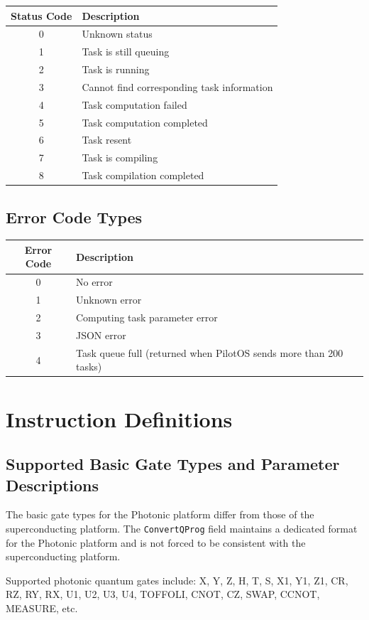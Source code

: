\documentclass[12pt, a4paper]{article}
\begin{document}
\begin{longtable}{|c|p{12cm}|}
\hline
\textbf{Status Code} & \textbf{Description} \\ \hline
\endhead
0 & Unknown status \\ \hline
1 & Task is still queuing \\ \hline
2 & Task is running \\ \hline
3 & Cannot find corresponding task information \\ \hline
4 & Task computation failed \\ \hline
5 & Task computation completed \\ \hline
6 & Task resent \\ \hline
7 & Task is compiling \\ \hline
8 & Task compilation completed \\ \hline
\end{longtable}

\subsection{Error Code Types}

\begin{longtable}{|c|p{12cm}|}
\hline
\textbf{Error Code} & \textbf{Description} \\ \hline
\endhead
0 & No error \\ \hline
1 & Unknown error \\ \hline
2 & Computing task parameter error \\ \hline
3 & JSON error \\ \hline
4 & Task queue full (returned when PilotOS sends more than 200 tasks) \\ \hline
\end{longtable}

\section{Instruction Definitions}

\subsection{Supported Basic Gate Types and Parameter Descriptions}

The basic gate types for the Photonic platform differ from those of the superconducting platform. The \texttt{ConvertQProg} field maintains a dedicated format for the Photonic platform and is not forced to be consistent with the superconducting platform.

Supported photonic quantum gates include: X, Y, Z, H, T, S, X1, Y1, Z1, CR, RZ, RY, RX, U1, U2, U3, U4, TOFFOLI, CNOT, CZ, SWAP, CCNOT, MEASURE, etc.
\end{document}
